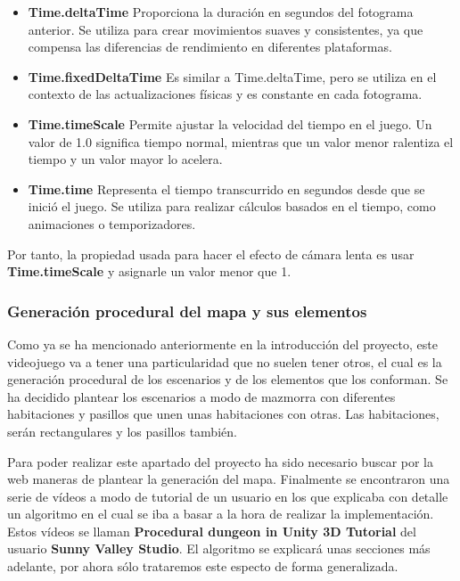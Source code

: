 \begin{itemize}    
    \item \textbf{Time.deltaTime} Proporciona la duración en segundos del fotograma anterior. Se utiliza para crear movimientos suaves y consistentes, ya que compensa las diferencias de rendimiento en diferentes plataformas.
   
    \item \textbf{Time.fixedDeltaTime}  Es similar a Time.deltaTime, pero se utiliza en el contexto de las actualizaciones físicas y es constante en cada fotograma.

    \item \textbf{Time.timeScale}  Permite ajustar la velocidad del tiempo en el juego. Un valor de 1.0 significa tiempo normal, mientras que un valor menor ralentiza el tiempo y un valor mayor lo acelera.

    \item \textbf{Time.time} Representa el tiempo transcurrido en segundos desde que se inició el juego. Se utiliza para realizar cálculos basados en el tiempo, como animaciones o temporizadores.
\end{itemize}

Por tanto, la propiedad usada para hacer el efecto de cámara lenta es usar \textbf{Time.timeScale} y asignarle un valor menor que 1.

\subsubsection{Generación procedural del mapa y sus elementos}

Como ya se ha mencionado anteriormente en la introducción del proyecto, este videojuego va a tener una particularidad que no suelen tener otros, el cual es la generación procedural de los escenarios y de los elementos que los conforman. Se ha decidido plantear los escenarios a modo de mazmorra con diferentes habitaciones y pasillos que unen unas habitaciones con otras. Las habitaciones, serán rectangulares y los pasillos también.

Para poder realizar este apartado del proyecto ha sido necesario buscar por la web maneras de plantear la generación del mapa. Finalmente se encontraron una serie de vídeos a modo de tutorial de un usuario en los que explicaba con detalle un algoritmo en el cual se iba a basar a la hora de realizar la implementación. Estos vídeos se llaman \textbf{Procedural dungeon in Unity 3D Tutorial} del usuario \textbf{Sunny Valley Studio}. El algoritmo se explicará unas secciones más adelante, por ahora sólo trataremos este especto de forma generalizada.

